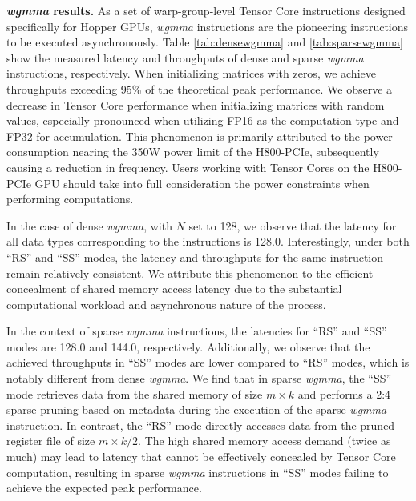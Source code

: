 \textbf{\emph{wgmma} results.} As a set of warp-group-level Tensor Core instructions designed specifically for Hopper GPUs, \emph{wgmma} instructions are the pioneering instructions to be executed asynchronously. Table \ref{tab:densewgmma} and \ref{tab:sparsewgmma} show the measured latency and throughputs of dense and sparse \emph{wgmma} instructions, respectively. When initializing matrices with zeros, we achieve throughputs exceeding 95\% of the theoretical peak performance. We observe a decrease in Tensor Core performance when initializing matrices with random values, especially pronounced when utilizing FP16 as the computation type and FP32 for accumulation. This phenomenon is primarily attributed to the power consumption nearing the 350W power limit of the H800-PCIe, subsequently causing a reduction in frequency. Users working with Tensor Cores on the H800-PCIe GPU should take into full consideration the power constraints when performing computations. 

In the case of dense \emph{wgmma}, with $N$ set to 128, we observe that the latency for all data types corresponding to the instructions is 128.0. Interestingly, under both ``RS'' and ``SS'' modes, the latency and throughputs for the same instruction remain relatively consistent. We attribute this phenomenon to the efficient concealment of shared memory access latency due to the substantial computational workload and asynchronous nature of the process.

In the context of sparse \emph{wgmma} instructions, the latencies for ``RS'' and ``SS'' modes are 128.0 and 144.0, respectively. Additionally, we observe that the achieved throughputs in ``SS'' modes are lower compared to ``RS'' modes, which is notably different from dense \emph{wgmma}. We find that in sparse \emph{wgmma}, the ``SS'' mode retrieves data from the shared memory of size $m \times k$ and performs a 2:4 sparse pruning based on metadata during the execution of the sparse \emph{wgmma} instruction. In contrast, the ``RS'' mode directly accesses data from the pruned register file of size $m \times k / 2$. The high shared memory access demand (twice as much) may lead to latency that cannot be effectively concealed by Tensor Core computation, resulting in sparse \emph{wgmma} instructions in ``SS'' modes failing to achieve the expected peak performance.

